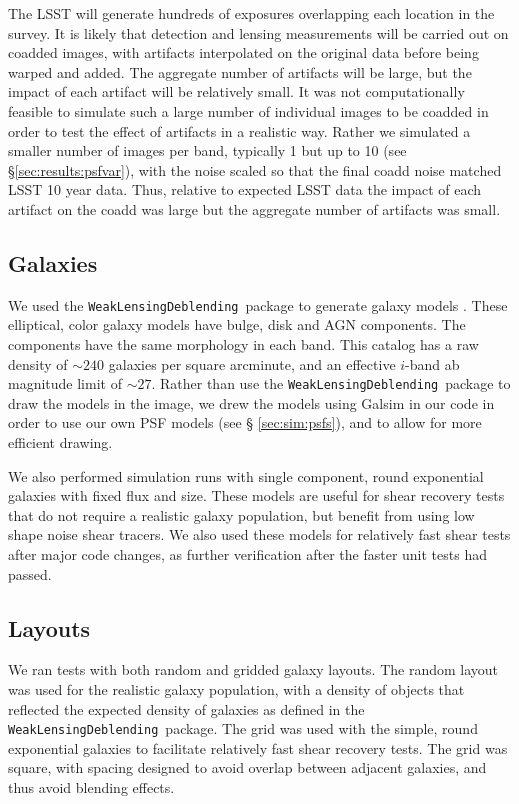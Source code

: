 \documentclass[twocolumn,twocolappendix,astrosym]{openjournal}
\newcommand{\descwl}{\texttt{WeakLensingDeblending}}
\begin{document}
The LSST will generate hundreds of exposures overlapping each location in the
survey.  It is likely that detection and lensing measurements will be carried
out on coadded images, with artifacts interpolated on the original data before
being warped and added.  The aggregate number of artifacts will be large, but
the impact of each artifact will be relatively small.  It was not
computationally feasible to simulate such a large number of individual images
to be coadded in order to test the effect of artifacts in a realistic way.
Rather we simulated a smaller number of images per band, typically 1 but up to
10 (see \S \ref{sec:results:psfvar}), with the noise scaled so that the final
coadd noise matched LSST 10 year data.  Thus, relative to expected LSST data
the impact of each artifact on the coadd was large but the aggregate number of
artifacts was small.

\subsection{Galaxies} \label{sec:sim:galaxies}

We used the \descwl\ package to generate galaxy models
\citep{DESCWLSanchez2021}.  These elliptical, color galaxy models have bulge,
disk and AGN components.  The components have the same morphology in each band.
This catalog has a raw density of $\sim240$ galaxies per square arcminute, and
an effective $i$-band ab magnitude limit of $\sim27$.  Rather than use the
\descwl\ package to draw the models in the image, we drew the models using
Galsim in our code in order to use our own PSF models (see \S
\ref{sec:sim:psfs}), and to allow for more efficient drawing.

We also performed simulation runs with single component, round exponential
galaxies with fixed flux and size.  These models are useful for shear recovery
tests that do not require a realistic galaxy population, but benefit from using
low shape noise shear tracers.  We also used these models for relatively fast
shear tests after major code changes, as further verification after the faster
unit tests had passed.

\subsection{Layouts} \label{sec:sim:layouts}

We ran tests with both random and gridded galaxy layouts.  The random layout
was used for the realistic galaxy population, with a density of objects that
reflected the expected density of galaxies as defined in the \descwl\ package.
The grid was used with the simple, round exponential galaxies to facilitate
relatively fast shear recovery tests.  The grid was square, with spacing
designed to avoid overlap between adjacent galaxies, and thus avoid blending
effects.
\end{document}
